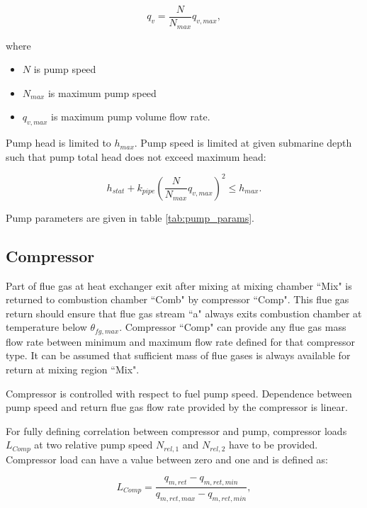 \documentclass{article}
\begin{document}
	\begin{equation}\label{eq:pump_vol_flow}
		q_v = \frac{N}{N_{max}} q_{v,max},
	\end{equation}
	
	\noindent
	where
	
	\begin{itemize}
		\item $N$ is pump speed
		\item $N_{max}$ is maximum pump speed
		\item $q_{v,max}$ is maximum pump volume flow rate.
	\end{itemize}

	\noindent
	Pump head is limited to $h_{max}$. Pump speed is limited at given submarine depth such that pump total head does not exceed maximum head:
	
	\begin{equation}\label{eq:total_head_limit}
		h_{stat} + k_{pipe} \left( \frac{N}{N_{max}} q_{v,max} \right)^2 \leq h_{max}.
	\end{equation}
	
	\noindent
	Pump parameters are given in table \ref{tab:pump_params}.
	
	\subsection*{Compressor}
	
	Part of flue gas at heat exchanger exit after mixing at mixing chamber “Mix" is returned to combustion chamber “Comb" by compressor “Comp". This flue gas return should ensure that flue gas stream “a" always exits combustion chamber at temperature below $\theta_{fg,max}$. Compressor “Comp" can provide any flue gas mass flow rate between minimum and maximum flow rate defined for that compressor type. It can be assumed that sufficient mass of flue gases is always available for return at mixing region “Mix".
	
	Compressor is controlled with respect to fuel pump speed.  Dependence between pump speed and return flue gas flow rate provided by the compressor is linear. 
	
	For fully defining correlation between compressor and pump, compressor loads $L_{Comp}$ at two relative pump speed $N_{rel,1}$ and $N_{rel,2}$ have to be provided. Compressor load can have a value between zero and one and is defined as:
	
	\begin{equation}\label{eq:compressor_load}
		L_{Comp} = \frac{q_{m,ret} - q_{m,ret,min}}{q_{m,ret,max} - q_{m,ret,min}},
	\end{equation}
	
\end{document}
